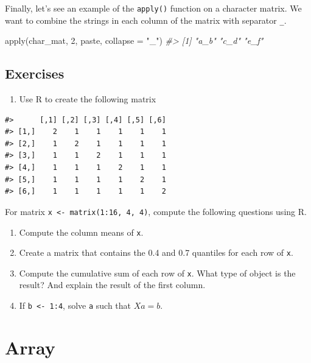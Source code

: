 \documentclass[
]{book}
\newenvironment{Shaded}{\begin{snugshade}}{\end{snugshade}}
\newcommand{\AttributeTok}[1]{\textcolor[rgb]{0.77,0.63,0.00}{#1}}
\newcommand{\CommentTok}[1]{\textcolor[rgb]{0.56,0.35,0.01}{\textit{#1}}}
\newcommand{\DecValTok}[1]{\textcolor[rgb]{0.00,0.00,0.81}{#1}}
\newcommand{\FunctionTok}[1]{\textcolor[rgb]{0.00,0.00,0.00}{#1}}
\newcommand{\NormalTok}[1]{#1}
\newcommand{\StringTok}[1]{\textcolor[rgb]{0.31,0.60,0.02}{#1}}
\providecommand{\tightlist}{%
  \setlength{\itemsep}{0pt}\setlength{\parskip}{0pt}}
\begin{document}
Finally, let's see an example of the \texttt{apply()} function on a character matrix. We want to combine the strings in each column of the matrix with separator \texttt{\_}.

\begin{Shaded}
\begin{Highlighting}[]
\FunctionTok{apply}\NormalTok{(char\_mat, }\DecValTok{2}\NormalTok{, paste, }\AttributeTok{collapse =} \StringTok{"\_"}\NormalTok{)}
\CommentTok{\#\textgreater{} [1] "a\_b" "c\_d" "e\_f"}
\end{Highlighting}
\end{Shaded}

\hypertarget{exercises-20}{%
\subsection{Exercises}\label{exercises-20}}

\begin{enumerate}
\def\labelenumi{\arabic{enumi}.}
\tightlist
\item
  Use R to create the following matrix
\end{enumerate}

\begin{verbatim}
#>      [,1] [,2] [,3] [,4] [,5] [,6]
#> [1,]    2    1    1    1    1    1
#> [2,]    1    2    1    1    1    1
#> [3,]    1    1    2    1    1    1
#> [4,]    1    1    1    2    1    1
#> [5,]    1    1    1    1    2    1
#> [6,]    1    1    1    1    1    2
\end{verbatim}

For matrix \texttt{x\ \textless{}-\ matrix(1:16,\ 4,\ 4)}, compute the following questions using R.

\begin{enumerate}
\def\labelenumi{\arabic{enumi}.}
\setcounter{enumi}{1}
\item
  Compute the column means of \texttt{x}.
\item
  Create a matrix that contains the 0.4 and 0.7 quantiles for each row of \texttt{x}.
\item
  Compute the cumulative sum of each row of \texttt{x}. What type of object is the result? And explain the result of the first column.
\item
  If \texttt{b\ \textless{}-\ 1:4}, solve \texttt{a} such that \(Xa = b\).
\end{enumerate}

\hypertarget{array}{%
\section{Array}\label{array}}
\end{document}
